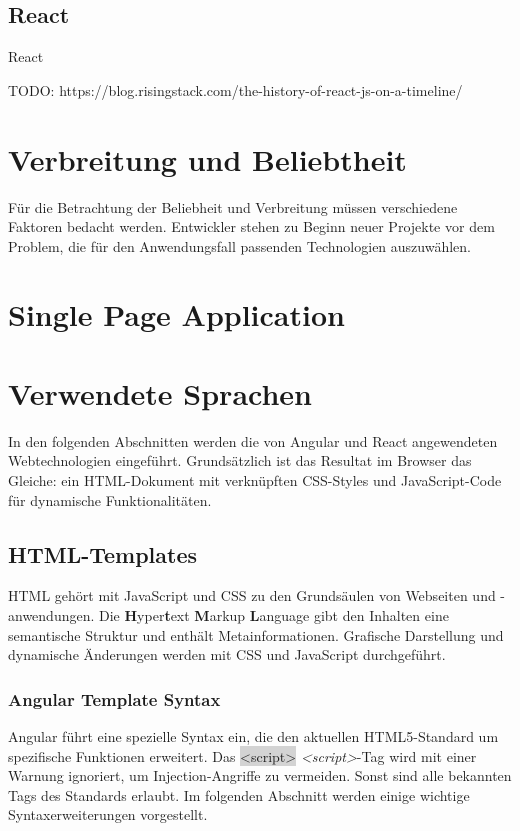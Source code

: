 \subsection{React}

React 

TODO: https://blog.risingstack.com/the-history-of-react-js-on-a-timeline/

\section{Verbreitung und Beliebtheit}

Für die Betrachtung der Beliebheit und Verbreitung müssen verschiedene Faktoren bedacht werden. Entwickler stehen zu Beginn neuer Projekte vor dem Problem, die für den Anwendungsfall passenden Technologien auszuwählen. 

\section{Single Page Application}

\section{Verwendete Sprachen}
In den folgenden Abschnitten werden die von Angular und React angewendeten Webtechnologien eingeführt. Grundsätzlich ist das Resultat im Browser das Gleiche: ein HTML-Dokument mit verknüpften CSS-Styles und JavaScript-Code für dynamische Funktionalitäten.

\subsection{HTML-Templates}
HTML gehört mit JavaScript und CSS zu den Grundsäulen von Webseiten und -anwendungen. Die \textbf{H}yper\textbf{t}ext \textbf{M}arkup \textbf{L}anguage gibt den Inhalten eine semantische Struktur und enthält Metainformationen. Grafische Darstellung und dynamische Änderungen werden mit CSS und JavaScript durchgeführt.

\subsubsection{Angular Template Syntax}

Angular führt eine spezielle Syntax ein, die den aktuellen HTML5-Standard um spezifische Funktionen erweitert. Das \colorbox{lightgray}{<script>} \textit{<script>}-Tag wird mit einer Warnung ignoriert, um Injection-Angriffe zu vermeiden. Sonst sind alle bekannten Tags des Standards erlaubt. Im folgenden Abschnitt werden einige wichtige Syntaxerweiterungen vorgestellt.

